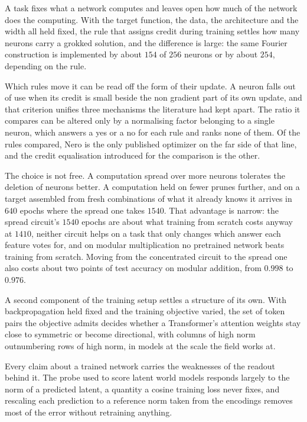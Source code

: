 
A task fixes what a network computes and leaves open how much of the network
does the computing. With the target function, the data, the architecture and
the width all held fixed, the rule that assigns credit during training settles
how many neurons carry a grokked solution, and the difference is large:
the same Fourier construction is implemented by about $154$ of $256$ neurons
or by about $254$, depending on the rule.

Which rules move it can be read off the form of their update. A neuron falls out of use when its credit is small
beside the non gradient part of its own update, and that criterion unifies
three mechanisms the literature had kept apart. The
ratio it compares can be altered only by a normalising factor belonging to a
single neuron, which answers a yes or a no for each rule and ranks none of
them. Of the rules compared, Nero is the only
published optimizer on the far side of that line, and the credit equalisation
introduced for the comparison is the other.

The choice is not free. A computation spread over more neurons tolerates the
deletion of neurons better. A computation held on fewer prunes further, and on a
target assembled from fresh combinations of what it already knows it arrives
in $640$ epochs where the spread one takes $1540$. That advantage is narrow:
the spread circuit's $1540$ epochs are about what training from scratch costs
anyway at $1410$, neither circuit helps on a task that only changes which answer each
feature votes for, and on modular multiplication no pretrained network beats
training from scratch. Moving from the concentrated circuit to the spread one
also costs about two points of test accuracy on modular addition, from $0.998$
to $0.976$.

A second component of the training setup settles a structure of its own. With
backpropagation held fixed and the training objective varied, the set of token
pairs the objective admits decides whether a Transformer's attention weights
stay close to symmetric or become directional, with columns of high norm
outnumbering rows of high norm, in models at the scale the field works at.

Every claim about a trained network carries the weaknesses of the readout
behind it. The probe used to score latent world models responds largely to the norm
of a predicted latent, a quantity a cosine training loss never fixes, and
rescaling each prediction to a reference norm taken from the encodings removes
most of the error without retraining anything.

